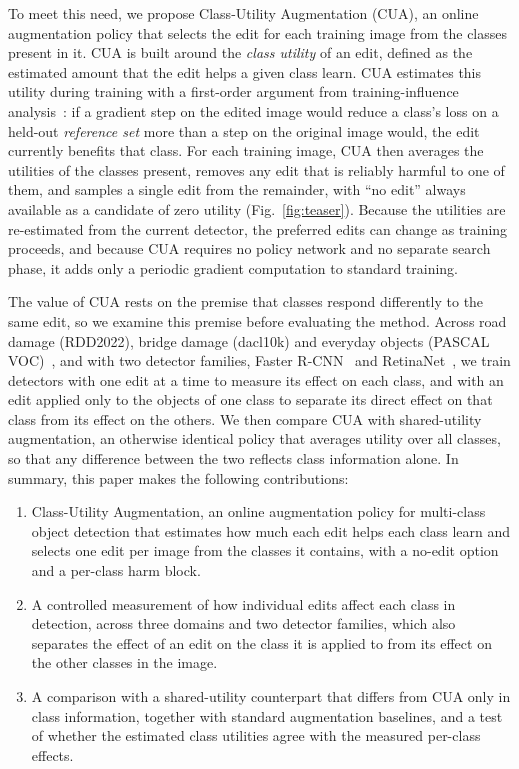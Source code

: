 To meet this need, we propose Class-Utility Augmentation (CUA), an online augmentation policy that selects the edit for each training image from the classes present in it. CUA is built around the \emph{class utility} of an edit, defined as the estimated amount that the edit helps a given class learn. CUA estimates this utility during training with a first-order argument from training-influence analysis~\cite{pruthi2020tracin}: if a gradient step on the edited image would reduce a class's loss on a held-out \emph{reference set} more than a step on the original image would, the edit currently benefits that class. For each training image, CUA then averages the utilities of the classes present, removes any edit that is reliably harmful to one of them, and samples a single edit from the remainder, with ``no edit'' always available as a candidate of zero utility (Fig.~\ref{fig:teaser}). Because the utilities are re-estimated from the current detector, the preferred edits can change as training proceeds, and because CUA requires no policy network and no separate search phase, it adds only a periodic gradient computation to standard training.

The value of CUA rests on the premise that classes respond differently to the same edit, so we examine this premise before evaluating the method. Across road damage (RDD2022), bridge damage (dacl10k) and everyday objects (PASCAL VOC)~\cite{everingham2010voc}, and with two detector families, Faster R-CNN~\cite{ren2017faster} and RetinaNet~\cite{lin2017focal}, we train detectors with one edit at a time to measure its effect on each class, and with an edit applied only to the objects of one class to separate its direct effect on that class from its effect on the others. We then compare CUA with shared-utility augmentation, an otherwise identical policy that averages utility over all classes, so that any difference between the two reflects class information alone.  In summary, this paper makes the following contributions:

\begin{enumerate}
    \item Class-Utility Augmentation, an online augmentation policy for multi-class object detection that estimates how much each edit helps each class learn and selects one edit per image from the classes it contains, with a no-edit option and a per-class harm block.
    \item A controlled measurement of how individual edits affect each class in detection, across three domains and two detector families, which also separates the effect of an edit on the class it is applied to from its effect on the other classes in the image.
    \item A comparison with a shared-utility counterpart that differs from CUA only in class information, together with standard augmentation baselines, and a test of whether the estimated class utilities agree with the measured per-class effects.
\end{enumerate}

